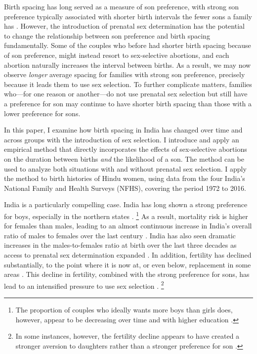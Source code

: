 Birth spacing has long served as a measure of son preference, with strong
son preference typically associated with shorter birth intervals the
fewer sons a family has \citep{ben-porath76b,Leung1988}.
However, the introduction of prenatal sex determination has the potential to 
change the relationship between son preference and birth spacing fundamentally.
Some of the couples who before had shorter birth spacing because of son preference,
might instead resort to sex-selective abortions, and each abortion naturally 
increases the interval between births.
As a result, we may now observe \emph{longer} average spacing for families with strong son 
preference, precisely because it leads them to use sex selection.
To further complicate matters, families who---for one reason or another---do 
not use prenatal sex selection but still have a preference for son may continue to have 
shorter birth spacing than those with a lower preference for sons.

In this paper, I examine how birth spacing in India has changed over time and across 
groups with the introduction of sex selection.
I introduce and apply an empirical method that directly incorporates the effects of 
sex-selective abortions on the duration between births 
\emph{and} 
the likelihood of a son. 
The method can be used to analyze both situations with and without prenatal
sex selection.
I apply the method to birth histories of Hindu women, using data from the four
India's National Family and Health Surveys (NFHS), covering the period 
1972 to 2016. 

India is a particularly compelling case.
India has long shown a strong preference for boys, especially in the northern 
states \citep{Kishor1993,murthi95,arnold98}.%
\footnote{
The proportion of couples who ideally wants more boys than girls does, however,
appear to be decreasing over time and with higher education \citep{bhat03,pande07}.
}
As a result, mortality risk is higher for females than males, leading to an almost
continuous increase in India's overall ratio of males to females over the last century 
\citep{dyson01,Navaneetham2011,Bongaarts2015}.
India has also seen dramatic increases in the males-to-females ratio  
at birth over the last three decades as access to prenatal sex determination 
expanded \citep{das_gupta97,Sudha1999,Arnold2002,retherford03b,jha06,Guilmoto2012}.
In addition, fertility has declined substantially, to the point where it is now
at, or even below, replacement in some areas 
\citep{Guilmoto2013,Dharmalingam2014,International-Institute-for-Population-Sciences-IIPS2017}.
This decline in fertility, combined with the strong preference for sons, has lead to an 
intensified pressure to use sex selection \citet{Guilmoto2009a,Bongaarts2013,Jayachandran2017}.%
\footnote{
In some instances, however, the fertility decline appears to have created a stronger 
aversion to daughters rather than a stronger preference for son \citet{DiamondSmith2008}.
}
 
